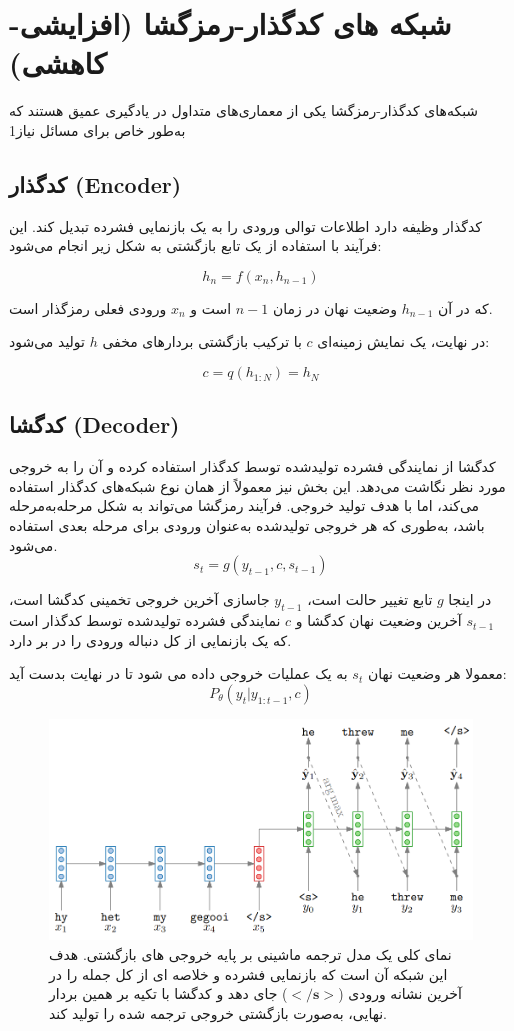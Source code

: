 \section{شبکه های کدگذار-رمزگشا (افزایشی-کاهشی)\protect{}}
شبکه‌های کدگذار-رمزگشا یکی از معماری‌های متداول در یادگیری عمیق هستند که به‌طور خاص برای مسائل نیاز1

\subsection{کدگذار (Encoder)}

کدگذار وظیفه دارد اطلاعات توالی ورودی را به یک بازنمایی فشرده تبدیل کند. این فرآیند با استفاده از یک تابع بازگشتی به شکل زیر انجام می‌شود:

$$
h_n = f(x_n, h_{n-1})
$$

که در آن $h_{n-1}$ وضعیت نهان در زمان $ n-1 $ است و $x_n$ ورودی فعلی رمزگذار است.

در نهایت، یک نمایش زمینه‌ای $ c $ با ترکیب بازگشتی بردارهای مخفی $ h $ تولید می‌شود:

$$
c = q(h_{1:N}) = h_N
$$

\subsection{کدگشا (Decoder)}
کدگشا از نمایندگی فشرده تولیدشده توسط کدگذار استفاده کرده و آن را به خروجی مورد نظر نگاشت می‌دهد. این بخش نیز معمولاً از همان نوع شبکه‌های کدگذار استفاده می‌کند، اما با هدف تولید خروجی. فرآیند رمزگشا می‌تواند به شکل مرحله‌به‌مرحله باشد، به‌طوری که هر خروجی تولیدشده به‌عنوان ورودی برای مرحله بعدی استفاده می‌شود.
$$
s_t = g(y_{t-1}, c, s_{t-1})
$$

در اینجا $ g $ تابع تغییر حالت است، $ y_{t-1} $ جاسازی%
آخرین خروجی تخمینی کدگشا است، $s_{t-1}$ آخرین وضعیت نهان کدگشا و $c$ نمایندگی فشرده تولیدشده توسط کدگذار است که یک بازنمایی از کل دنباله ورودی را در بر دارد.

معمولا هر وضعیت نهان $s_t$ به یک عملیات خروجی داده می شود تا در نهایت بدست آید:
$$ P_{\theta}(y_{t} | y_{1:t-1},c) $$

\begin{figure}
	\centering
	\includegraphics[width=1\linewidth]{figs/rnn_without_attn}
	\caption{نمای کلی یک مدل ترجمه ماشینی بر پایه خروجی های بازگشتی. هدف این شبکه آن است که بازنمایی فشرده و خلاصه ای از کل جمله را در آخرین نشانه ورودی
	($\mathbf{</s>}$)
	جای دهد و کدگشا با تکیه بر همین بردار نهایی، به‌صورت بازگشتی خروجی ترجمه شده را تولید کند.
	}
	\label{fig:rnnwithoutattn}
\end{figure}


